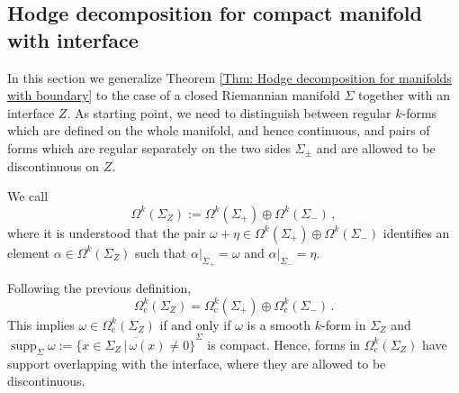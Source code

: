 \subsection{Hodge decomposition for compact manifold with interface}
In this section we generalize Theorem \ref{Thm: Hodge decomposition for manifolds with boundary} to the case of a closed Riemannian manifold $\Sigma$ together with an interface $Z$. As starting point, we need to distinguish between regular $k$-forms which are defined on the whole manifold, and hence continuous, and pairs of forms which are regular separately on the two sides $\Sigma_\pm$ and are allowed to be discontinuous on $Z$.
\begin{Definition}
	We call
	\begin{equation}\label{Eqn: splitting of k-forms with interface}
		\Omega^k(\Sigma_Z):=\Omega^k(\Sigma_+)\oplus\Omega^k(\Sigma_-)\,,
	\end{equation}
	where it is understood that the pair $\omega+\eta\in\Omega^k(\Sigma_+)\oplus\Omega^k(\Sigma_-)$ identifies an element $\alpha\in\Omega^k(\Sigma_Z)$ such that $\alpha|_{\Sigma_+}=\omega$ and $\alpha|_{\Sigma_-}=\eta$.
\end{Definition}

\noindent	Following the previous definition,
	\begin{equation}
		\Omega_\mathrm{c}^k(\Sigma_Z)=\Omega_\mathrm{c}^k(\Sigma_+)\oplus \Omega_\mathrm{c}^k(\Sigma_-)\,.
	\end{equation}
	 This implies $\omega\in \Omega_\mathrm{c}^k(\Sigma_Z)$ if and only if $\omega$ is a smooth $k$-form in $\Sigma_Z$ and $\operatorname{supp}_\Sigma \omega:=\overline{\{x\in\Sigma_Z\,|\, \omega(x)\neq 0\}}^\Sigma$  is compact. Hence, forms in $\Omega_\mathrm{c}^k(\Sigma_Z)$ have support overlapping with the interface, where they are allowed to be discontinuous.\\

